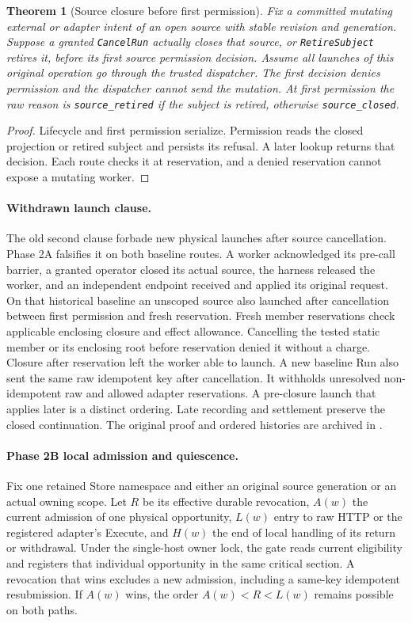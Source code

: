 \documentclass[11pt,a4paper]{article}
\newtheorem{theorem}{Theorem}[section]
\theoremstyle{definition}
\theoremstyle{remark}
\begin{document}
\begin{theorem}[Source closure before first permission]
\label{thm:dichotomy}
Fix a committed mutating external or adapter intent of an open source with stable revision and generation. Suppose a granted \texttt{CancelRun} actually closes that source, or \texttt{RetireSubject} retires it, before its first source permission decision. Assume all launches of this original operation go through the trusted dispatcher. The first decision denies permission and the dispatcher cannot send the mutation. At first permission the raw reason is \texttt{source\_retired} if the subject is retired, otherwise \texttt{source\_closed}.
\end{theorem}
\begin{proof}
Lifecycle and first permission serialize. Permission reads the closed projection or retired subject and persists its refusal. A later lookup returns that decision. Each route checks it at reservation, and a denied reservation cannot expose a mutating worker.
\end{proof}
\paragraph{Withdrawn launch clause.}
The old second clause forbade new physical launches after source cancellation. Phase 2A falsifies it on both baseline routes. A worker acknowledged its pre-call barrier, a granted operator closed its actual source, the harness released the worker, and an independent endpoint received and applied its original request. On that historical baseline an unscoped source also launched after cancellation between first permission and fresh reservation. Fresh member reservations check applicable enclosing closure and effect allowance. Cancelling the tested static member or its enclosing root before reservation denied it without a charge. Closure after reservation left the worker able to launch. A new baseline Run also sent the same raw idempotent key after cancellation. It withholds unresolved non-idempotent raw and allowed adapter reservations. A pre-closure launch that applies later is a distinct ordering. Late recording and settlement preserve the closed continuation. The original proof and ordered histories are archived in .

\paragraph{Phase 2B local admission and quiescence.} Fix one retained Store namespace and either an original source generation or an actual owning scope. Let $R$ be its effective durable revocation, $A(w)$ the current admission of one physical opportunity, $L(w)$ entry to raw HTTP or the registered adapter's Execute, and $H(w)$ the end of local handling of its return or withdrawal. Under the single-host owner lock, the gate reads current eligibility and registers that individual opportunity in the same critical section. A revocation that wins excludes a new admission, including a same-key idempotent resubmission. If $A(w)$ wins, the order $A(w)<R<L(w)$ remains possible on both paths.
\end{document}
